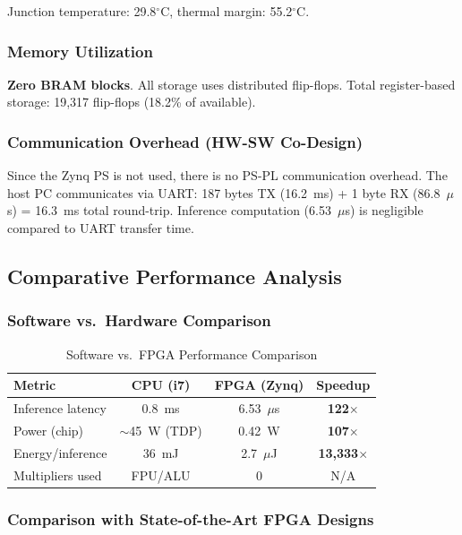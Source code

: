 \documentclass[conference]{IEEEtran}
\begin{document}
Junction temperature: 29.8$^\circ$C, thermal margin: 55.2$^\circ$C.

\subsubsection{Memory Utilization}
\textbf{Zero BRAM blocks}. All storage uses distributed flip-flops. Total register-based storage: 19,317 flip-flops (18.2\% of available).

\subsubsection{Communication Overhead (HW-SW Co-Design)}
Since the Zynq PS is not used, there is no PS-PL communication overhead. The host PC communicates via UART: 187 bytes TX (16.2~ms) + 1 byte RX (86.8~$\mu$s) = 16.3~ms total round-trip. Inference computation (6.53~$\mu$s) is negligible compared to UART transfer time.

\subsection{Comparative Performance Analysis}

\subsubsection{Software vs.\ Hardware Comparison}

\begin{table}[htbp]
    \centering
    \caption{Software vs.\ FPGA Performance Comparison}
    \label{tab:sw_hw_compare}
    \begin{tabular}{lccc}
        \toprule
        \textbf{Metric} & \textbf{CPU (i7)} & \textbf{FPGA (Zynq)} & \textbf{Speedup} \\
        \midrule
        Inference latency & 0.8~ms & 6.53~$\mu$s & \textbf{122$\times$} \\
        Power (chip) & $\sim$45~W (TDP) & 0.42~W & \textbf{107$\times$} \\
        Energy/inference & 36~mJ & 2.7~$\mu$J & \textbf{13,333$\times$} \\
        Multipliers used & FPU/ALU & 0 & N/A \\
        \bottomrule
    \end{tabular}
\end{table}

\subsubsection{Comparison with State-of-the-Art FPGA Designs}
\end{document}
